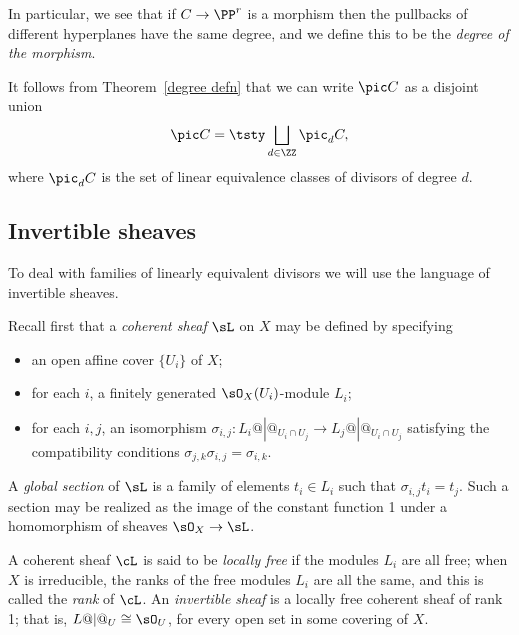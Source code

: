 In particular, we see that if $C\to \PP^{r}$ is a morphism then
the pullbacks of different hyperplanes
have the same degree, and we define this to be the
\emph{degree of the morphism}.
%

It follows from Theorem~\ref{degree defn} that we can write $\pic C$ as a disjoint union
$$
\pic C = \tsty\bigsqcup\limits_{d \in \ZZ} \pic_d C,
$$
where $\pic_d C$ is the set of linear equivalence classes of divisors of degree $d$.

\subsection*{Invertible sheaves}%

To deal with families of linearly equivalent divisors we will use the language of invertible sheaves.
%

Recall first that a \emph{coherent sheaf} $\sL$ on $X$ may be defined by
%
specifying
\begin{itemize}
 \item an open affine cover $\{U_{i}\}$ of $X$;
 \item for each $i$, a finitely generated $\sO_{X}(U_{i})$-module $L_{i}$;
 \item for each $i,j$, an isomorphism $\sigma_{i,j}: L_{i}@|@_{U_{i}\cap U_{j}} \to L_{j}@|@_{U_{i}\cap U_{j}}$
 satisfying the compatibility conditions $\sigma_{j,k}\sigma_{i,j} = \sigma_{i,k}$.
 \end{itemize}

A
\emph{global section}
%
of $\sL$ is a family of elements $t_{i}\in L_{i}$ such that
$\sigma_{i,j} t_{i} = t_{j}$. Such a section may be realized as the image of the constant function 1 under
a homomorphism of sheaves $\sO_{X} \to \sL$.

A coherent sheaf $\cL$ is said to be
\emph{locally free}
%
if the modules $L_i$ are all free; when $X$ is irreducible, the ranks
of the free modules $L_{i}$ are all the same, and this is called the
\emph{rank}
%
of $\cL$.
An
\emph{invertible sheaf}
%
is a locally free coherent sheaf of rank 1;  that is, $L@|@_U \cong \sO_U$,
for every open set in some covering of $X$.

